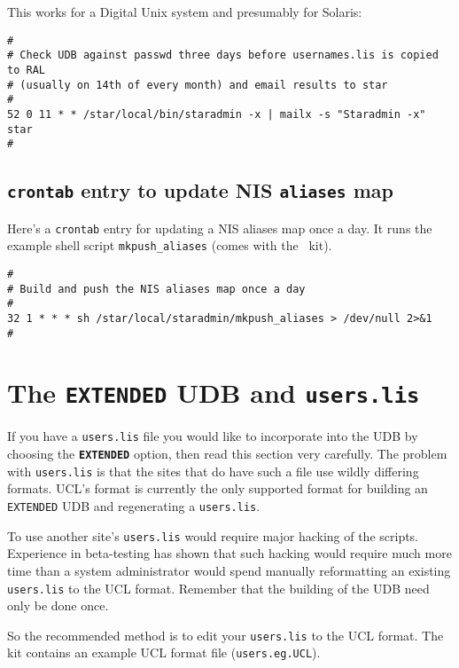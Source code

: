 This works for a Digital Unix system and presumably for Solaris:

\begin{verbatim}
#
# Check UDB against passwd three days before usernames.lis is copied to RAL 
# (usually on 14th of every month) and email results to star
#
52 0 11 * * /star/local/bin/staradmin -x | mailx -s "Staradmin -x" star
#
\end{verbatim}

\subsection{{\tt crontab} entry to update NIS {\tt aliases} map}
\label{cronalias}

Here's a {\tt crontab} entry for updating a NIS aliases map once a day.
It runs the example shell script {\tt mkpush\_aliases} (comes with the 
\staradmin\ kit).

\begin{verbatim}
#
# Build and push the NIS aliases map once a day
#
32 1 * * * sh /star/local/staradmin/mkpush_aliases > /dev/null 2>&1
#
\end{verbatim}


\appendix
\newpage
\section{The {\tt EXTENDED} UDB and {\tt users.lis}}
\label{ifusers}

If you have a {\tt users.lis} file you would like to incorporate into the
UDB by choosing the {\bf\tt EXTENDED} option, then read this section very
carefully. The problem with {\tt users.lis} is that the sites that do have
such a file use wildly differing formats. UCL's format is currently the
only supported format for building an {\tt EXTENDED} UDB and regenerating
a {\tt users.lis}. 

To use another site's {\tt users.lis} would require major hacking of the
scripts. Experience in beta-testing has shown that such hacking would
require much more time than a system administrator would spend manually
reformatting an existing {\tt users.lis} to the UCL format. Remember that
the building of the UDB need only be done once. 

So the recommended method is to edit your {\tt users.lis} to the UCL
format.  The kit contains an example UCL format file ({\tt users.eg.UCL}). 

